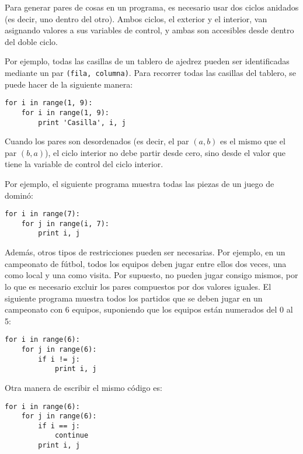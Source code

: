Para generar pares de cosas en un programa, es necesario usar dos ciclos
anidados (es decir, uno dentro del otro).
Ambos ciclos, el exterior y el interior, van asignando valores a sus
variables de control, y ambas son accesibles desde dentro del doble
ciclo.

Por ejemplo, todas las casillas de un tablero de ajedrez pueden ser
identificadas mediante un par \lstinline!(fila, columna)!. Para recorrer
todas las casillas del tablero, se puede hacer de la siguiente manera:

\begin{lstlisting}
for i in range(1, 9):
    for i in range(1, 9):
        print 'Casilla', i, j
\end{lstlisting}

Cuando los pares son desordenados (es decir, el par \((a, b)\) es el mismo
que el par \((b, a)\)), el ciclo interior no debe partir desde cero, sino
desde el valor que tiene la variable de control del ciclo interior.

Por ejemplo, el siguiente programa muestra todas las piezas de un juego
de dominó:

\begin{lstlisting}
for i in range(7):
    for j in range(i, 7):
        print i, j
\end{lstlisting}

Además, otros tipos de restricciones pueden ser necesarias. Por ejemplo,
en un campeonato de fútbol, todos los equipos deben jugar entre ellos
dos veces, una como local y una como visita. Por supuesto, no pueden
jugar consigo mismos, por lo que es necesario excluir los pares
compuestos por dos valores iguales. El siguiente programa muestra todos
los partidos que se deben jugar en un campeonato con 6 equipos,
suponiendo que los equipos están numerados del 0 al 5:

\begin{lstlisting}
for i in range(6):
    for j in range(6):
        if i != j:
            print i, j
\end{lstlisting}

Otra manera de escribir el mismo código es:

\begin{lstlisting}
for i in range(6):
    for j in range(6):
        if i == j:
            continue
        print i, j
\end{lstlisting}

